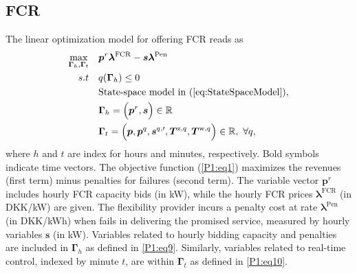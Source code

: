 \documentclass[conference]{IEEEtran}
\begin{document}
\vspace{1mm}
\subsection{FCR}
\vspace{-1mm}
The linear optimization model for offering FCR reads as
%
\begin{subequations}\label{P1:compact_model_fcr}
    \begin{align}
        \underset{\bm{\Gamma}_{h},\bm{\Gamma}_{t}}{\textrm{max}} \quad & \bm{p}^{r} \bm{\lambda}^{\text{FCR}} - \bm{s}\bm{\lambda}^{\text{Pen}} \label{P1:eq1}
        \\
        s.t \quad                                                      & q(\bm{\Gamma}_{h}) \leq 0 \label{P1:eq2}                                                                                                                      \\
        \quad                                                          & \text{State-space model in } (\ref{eq:StateSpaceModel}), \label{P1:eq8}                                                                                       \\
        \quad
                                                                       & \bm{\Gamma}_{h} = \Bigl( \bm{p}^{r}, \bm{s} \Bigr) \in \mathbb{R}  \label{P1:eq9}                                                                             \\
        \quad
                                                                       & \bm{\Gamma}_{t} = \Bigl( \bm{p}, \bm{p}^{q}, \bm{s}^{q, \prime}, \bm{T}^{\text{z},q}, \bm{T}^{\text{w},q} \Bigr) \in \mathbb{R}, \ \forall{q}, \label{P1:eq10}
    \end{align}
\end{subequations}
where $h$ and $t$ are index for hours and minutes, respectively. Bold symbols indicate time vectors. The objective function (\ref{P1:eq1}) maximizes the revenues (first term) minus penalties for failures (second term). The variable vector $\bm{p}^{r}$ includes hourly FCR capacity bids (in kW), while the hourly FCR prices $\bm{\lambda}^{\text{FCR}}$ (in DKK/kW) are given. The flexibility provider incurs a penalty cost at rate $\bm{\lambda}^{\text{Pen}}$ (in DKK/kWh) when fails in delivering the promised service, measured by hourly variables $\bm{s}$ (in kW).
Variables related to hourly bidding capacity and penalties are included in $\bm{\Gamma}_{h}$ as defined in \eqref{P1:eq9}. Similarly, variables related to real-time control, indexed by minute $t$, are within $\bm{\Gamma}_{t}$ as defined in \eqref{P1:eq10}.
\end{document}
